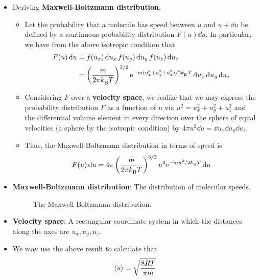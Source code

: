 \documentclass[../notes.tex]{subfiles}
\begin{document}
\begin{itemize}
    \item Deriving \textbf{Maxwell-Boltzmann distribution}.
    \begin{itemize}
        \item Let the probability that a molecule has speed between $u$ and $u+\dd{u}$ be defined by a continuous probability distribution $F(u)\dd{u}$. In particular, we have from the above isotropic condition that
        \begin{align*}
            F(u)\dd{u} &= f(u_x)\dd{u_x}f(u_y)\dd{u_y}f(u_z)\dd{u_z}\\
            &= \left( \frac{m}{2\pi \kB T} \right)^{3/2}\e[-m(u_x^2+u_y^2+u_z^2)/2\kB T]\dd{u_x}\dd{u_y}\dd{u_z}
        \end{align*}
        \item Considering $F$ over a \textbf{velocity space}, we realize that we may express the probability distribution $F$ as a function of $u$ via $u^2=u_x^2+u_y^2+u_z^2$ and the differential volume element in every direction over the sphere of equal velocities (a sphere by the isotropic condition) by $4\pi u^2\dd{u}=\dd{u_x}\dd{u_y}\dd{u_z}$.
        \item Thus, the Maxwell-Boltzmann distribution in terms of speed is
        \begin{equation*}
            F(u)\dd{u} = 4\pi\left( \frac{m}{2\pi \kB T} \right)^{3/2}u^2\e[-mu^2/2\kB T]\dd{u}
        \end{equation*}
    \end{itemize}
    \item \textbf{Maxwell-Boltzmann distribution}: The distribution of molecular speeds.
    \begin{figure}[H]
        \centering
        \caption{The Maxwell-Boltzmann distribution.}
        \label{fig:MBdist}
    \end{figure}
    \item \textbf{Velocity space}: A rectangular coordinate system in which the distances along the axes are $u_x,u_y,u_z$.
    \item We may use the above result to calculate that
    \begin{equation*}
        \prb{u} = \sqrt{\frac{8RT}{\pi m}}
    \end{equation*}

\end{itemize}
\end{document}

